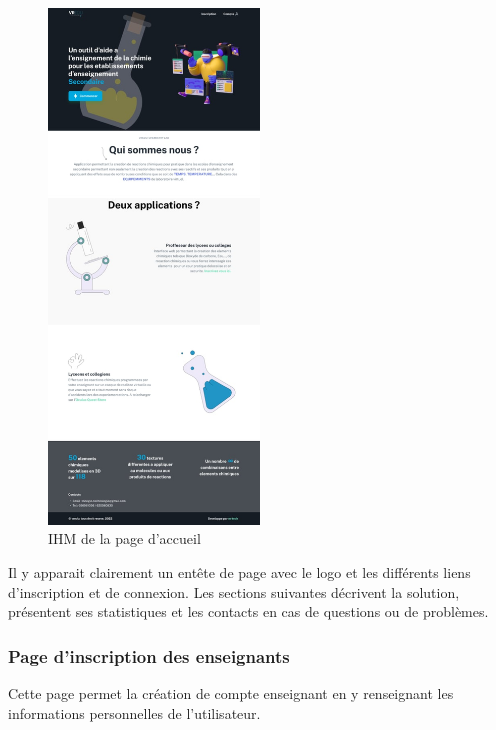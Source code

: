 \begin{figure}[H]
	\centering
	\includegraphics[width=0.5\textwidth]{img/home}
	\caption{IHM de la page d'accueil}
	\label{fig:mesh1}
\end{figure}

Il y apparait clairement un entête de page avec le logo et les différents liens d'inscription et de connexion.
Les sections suivantes décrivent la solution, présentent ses statistiques et les contacts en cas de questions ou de problèmes.

\subsubsection{Page d'inscription des enseignants}

Cette page permet la création de compte enseignant en y renseignant les informations personnelles de l'utilisateur.

